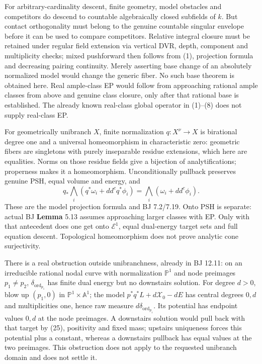 \documentclass[
  11pt,
]{article}
\begin{document}
For arbitrary-cardinality descent, finite geometry, model obstacles and
competitors do descend to countable algebraically closed subfields of
\(k\). But contact orthogonality must belong to the genuine countable
singular envelope before it can be used to compare competitors. Relative
integral closure must be retained under regular field extension via
vertical DVR, depth, component and multiplicity checks; mixed
pushforward then follows from (1), projection formula and decreasing
pairing continuity. Merely asserting base change of an absolutely
normalized model would change the generic fiber. No such base theorem is
obtained here. Real ample-class EP would follow from approaching
rational ample classes from above and genuine class closure, only after
that rational base is established. The already known real-class global
operator in (1)--(8) does not supply real-class EP.

For geometrically unibranch \(X\), finite normalization \(q:X^\nu\to X\)
is birational degree one and a universal homeomorphism in characteristic
zero: geometric fibers are singletons with purely inseparable residue
extensions, which here are equalities. Norms on those residue fields
give a bijection of analytifications; properness makes it a
homeomorphism. Unconditionally pullback preserves genuine PSH, equal
volume and energy, and \[q_*\bigwedge_i(q^*\omega_i+dd^cq^*\phi_i)
                 =\bigwedge_i(\omega_i+dd^c\phi_i). \tag{25}\] These are
the model projection formula and BJ 7.2/7.19. Onto PSH is separate:
actual BJ \textbf{Lemma} 5.13 assumes approaching larger classes with
EP. Only with that antecedent does one get onto \(\mathcal E^1\), equal
dual-energy target sets and full equation descent. Topological
homeomorphism does not prove analytic cone surjectivity.

There is a real obstruction outside unibranchness, already in BJ 12.11:
on an irreducible rational nodal curve with normalization
\(\mathbb P^1\) and node preimages \(p_1\ne p_2\),
\(\delta_{\operatorname{ord}_{p_1}}\) has finite dual energy but no
downstairs solution. For degree \(d>0\), blow up \((p_1,0)\) in
\(\mathbb P^1\times\mathbb A^1\); the model \(p^*q^*L+d\mathcal X_0-dE\)
has central degrees \(0,d\) and multiplicities one, hence raw measure
\(d\delta_{\operatorname{ord}_{p_1}}\). Its potential has endpoint
values \(0,d\) at the node preimages. A downstairs solution would pull
back with that target by (25), positivity and fixed mass; upstairs
uniqueness forces this potential plus a constant, whereas a downstairs
pullback has equal values at the two preimages. This obstruction does
not apply to the requested unibranch domain and does not settle it.
\end{document}
